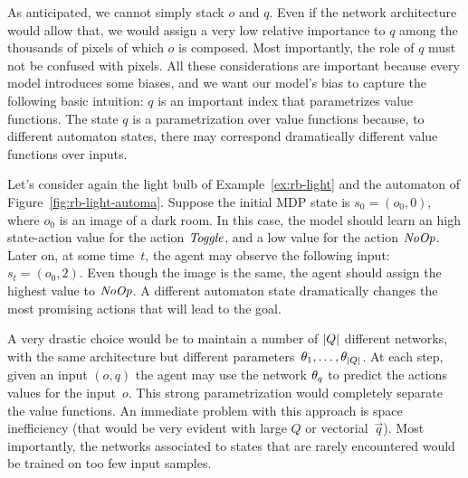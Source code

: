 As anticipated, we cannot simply stack $o$ and $q$. Even if the network
architecture would allow that, we would assign a very low relative importance
to $q$ among the thousands of pixels of which $o$ is composed. Most
importantly, the role of $q$ must not be confused with pixels. All these
considerations are important because every model introduces some biases, and
we want our model's bias to capture the following basic intuition: $q$ is an
important index that parametrizes value functions. The state $q$ is a
parametrization over value functions because, to different automaton states,
there may correspond dramatically different value functions over inputs.

\begin{example}
	Let's consider again the light bulb of Example~\ref{ex:rb-light} and
	the automaton of Figure~\ref{fig:rb-light-automa}. Suppose the initial MDP
	state is $s_0 = (o_0, 0)$, where $o_0$ is an image of a dark room. In this
	case, the model should learn an high state-action value for the action
	$\text{\textit{Toggle}}$, and a low value for the action $\text{\textit{NoOp}}$. Later on,
	at some time~$t$, the agent may observe the following input: $s_t = (o_0,
	2)$. Even though the image is the same, the agent should assign the highest
	value to $\text{\textit{NoOp}}$. A different automaton state dramatically changes
	the most promising actions that will lead to the goal.
\end{example}

A very drastic choice would be to maintain a number of $\lvert Q\rvert$ different
networks, with the same architecture but different parameters~$\theta_1,
\dots, \theta_{\lvert Q\rvert}$. At each step, given an input $(o, q)$ the agent may
use the network $\theta_q$ to predict the actions values for the input~$o$.
This strong parametrization would completely separate the value functions.
An immediate problem with this approach is space inefficiency (that would be
very evident with large $Q$ or vectorial~$\vec{q}$). Most importantly, the
networks associated to states that are rarely encountered would be trained
on too few input samples.


